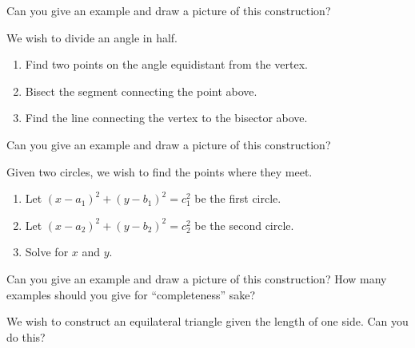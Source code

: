 \begin{question}
Can you give an example and draw a picture of this construction?
\end{question}
\QM


\begin{construction} 
We wish to divide an angle in half.
\begin{enumerate}
\item Find two points on the angle equidistant from the vertex.
\item Bisect the segment connecting the point above.
\item Find the line connecting the vertex to the bisector above.
\end{enumerate}
\end{construction}

\begin{question}
Can you give an example and draw a picture of this construction?
\end{question}
\QM




\begin{construction} 
Given two circles, we wish to find the points where they meet.
\begin{enumerate} 
\item Let $(x-a_1)^2 + (y-b_1)^2 = c_1^2$ be the first circle.
\item Let $(x-a_2)^2 + (y-b_2)^2 = c_2^2$ be the second circle.
\item Solve for $x$ and $y$.
\end{enumerate}
\end{construction}


\begin{question}
Can you give an example and draw a picture of this construction? How
many examples should you give for ``completeness'' sake?
\end{question}
\QM



\begin{question} 
We wish to construct an equilateral triangle given the length of one
side. Can you do this?
\end{question}
\QM






